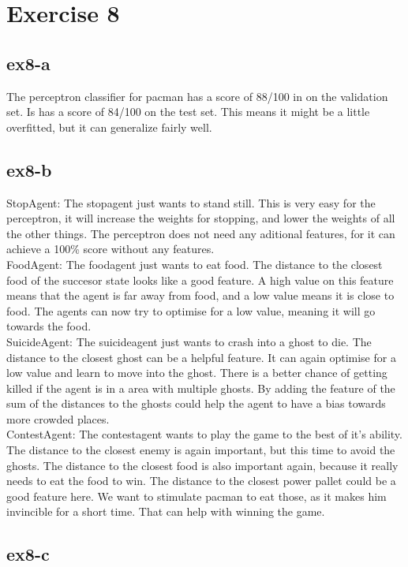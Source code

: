\section{Exercise 8}
\subsection{ex8-a}
The perceptron classifier for pacman has a score of 88/100 in on the validation set. Is has a score of 84/100 on the test set. This means it might be a little overfitted, but it can generalize fairly well.
\subsection{ex8-b}
StopAgent: The stopagent just wants to stand still. This is very easy for the perceptron, it will increase the weights for stopping, and lower the weights of all the other things. The perceptron does not need any aditional features, for it can achieve a 100\% score without any features. \\
FoodAgent: The foodagent just wants to eat food. The distance to the closest food of the succesor state looks like a good feature. A high value on this feature means that the agent is far away from food, and a low value means it is close to food. The agents can now try to optimise for a low value, meaning it will go towards the food. \\
SuicideAgent: The suicideagent just wants to crash into a ghost to die. The distance to the closest ghost can be a helpful feature. It can again optimise for a low value and learn to move into the ghost. There is a better chance of getting killed if the agent is in a area with multiple ghosts. By adding the feature of the sum of the distances to the ghosts could help the agent to have a bias towards more crowded places. \\
ContestAgent: The contestagent wants to play the game to the best of it's ability. The distance to the closest enemy is again important, but this time to avoid the ghosts. The distance to the closest food is also important again, because it really needs to eat the food to win. The distance to the closest power pallet could be a good feature here. We want to stimulate pacman to eat those, as it makes him invincible for a short time. That can help with winning the game. 
\subsection{ex8-c}
